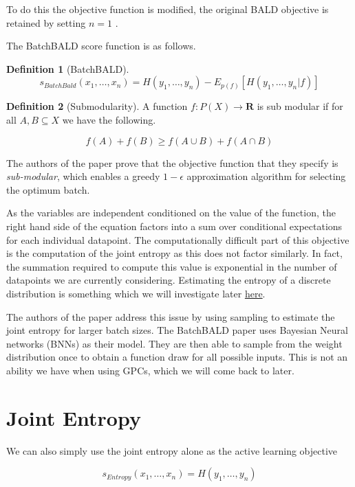 \documentclass[12pt, a4paper]{report}
\theoremstyle{definition}
\theoremstyle{definition}
\newtheorem{definition}{Definition}[section]
\theoremstyle{definition}
\begin{document}
To do this the objective function is modified, the original BALD objective is retained by setting $n = 1$ .

The BatchBALD score function is as follows.


\begin{definition}[BatchBALD]
    $$s_{BatchBald} (x_1, \ldots, x_n) = H(y_1, \ldots, y_n) - E_{p(f)}\left[H(y_1, \ldots, y_n | f)\right]$$
\end{definition}


\begin{definition}[Submodularity]
    A function $f : P(X) \rightarrow \mathbf{R}$ is sub modular if for all $A,B \subseteq X$ we have the following.

    $$f(A) + f(B) \geq f\left( A \cup B \right) +  f\left(A \cap B \right) $$
\end{definition}

The authors of the paper prove that the objective function that they specify is \textit{sub-modular}, which enables a greedy $1 - \epsilon$ approximation algorithm for selecting the optimum batch.



As the variables are independent conditioned on the value of the function, the right hand side of the equation factors into a sum over conditional expectations for each individual datapoint. The computationally difficult part of this objective is the computation of the joint entropy as this does not factor similarly. In fact, the summation required to compute this value is exponential in the number of datapoints we are currently considering. Estimating the entropy of a discrete distribution is something which we will investigate later \hyperref[sec:Entropy]{here}.


The authors of the paper address this issue by using sampling to estimate the joint entropy for larger batch sizes. The BatchBALD paper uses Bayesian Neural networks (BNNs) as their model. They are then able to sample from the weight distribution once to obtain a function draw for all possible inputs. This is not an ability we have when using GPCs, which we will come back to later.


\section{Joint Entropy}

We can also simply use the joint entropy alone as the active learning objective

$$s_{Entropy} (x_1, \ldots, x_n) = H(y_1, \ldots, y_n)$$
\end{document}
